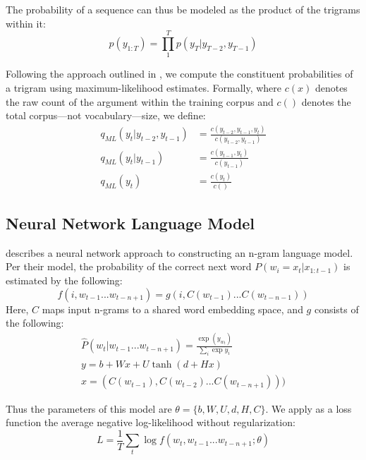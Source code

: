 \documentclass[11pt]{article}
\begin{document}
The probability of a sequence can thus be modeled as the product of the trigrams within it:
$$ p(y_{1:T}) = \prod_{1}^{T} p(y_T|y_{T-2},y_{T-1}) $$

Following the approach outlined in \cite{collins2013}, we compute the constituent probabilities of a trigram using maximum-likelihood estimates. Formally, where $c(x)$ denotes the raw count of the argument within the training corpus and $c()$ denotes the total corpus---not vocabulary---size, we define:
\begin{align*}
  q_{ML}(y_t|y_{t-2},y_{t-1}) &= \frac{c(y_{t-2}, y_{t-1}, y_t)}{c(y_{t-2}, y_{t-1})} \\
  q_{ML}(y_t|y_{t-1}) &= \frac{c(y_{t-1}, y_t)}{c(y_{t-1})} \\
  q_{ML}(y_t) &= \frac{c(y_t)}{c()}
\end{align*}



\subsection{Neural Network Language Model}

\cite{bengio2003neural} describes a neural network approach to constructing an n-gram language model. Per their model, the probability of the correct next word $P(w_i = x_t|x_{1:t-1})$ is estimated by the following:
$$f(i, w_{t-1}...w_{t-n+1}) = g(i, C(w_{t-1})...C(w_{t-n-1}))$$
Here, $C$ maps input n-grams to a shared word embedding space, and $g$ consists of the following:
\begin{align*}
  \hat{P}(w_t|w_{t-1}...w_{t-n+1})=\frac{\exp(y_{w_t})}{\sum_{i}\exp{y_i}} \\
  y = b+Wx+U\tanh(d+Hx) \\
  x = (C(w_{t-1}),C(w_{t-2})...C(w_{t-n+1})))
\end{align*}

Thus the parameters of this model are $\theta=\{b,W,U,d,H,C\}$. We apply as a loss function the average negative log-likelihood without regularization:
$$L=\frac{1}{T} \sum_{t} \log f(w_t,w_{t-1}...w_{t-n+1}; \theta)$$
\end{document}
